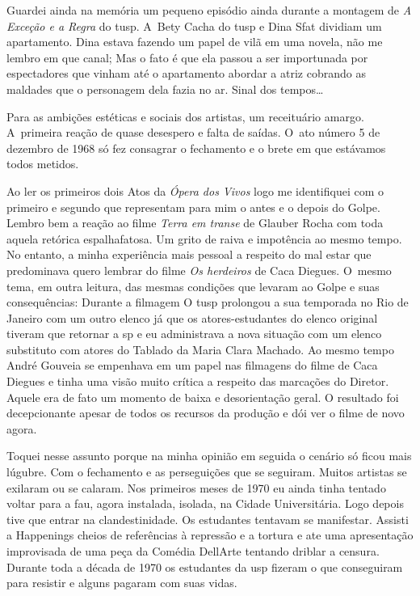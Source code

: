 Guardei ainda na memória um pequeno episódio ainda durante a montagem de
{\it A Exceção e a Regra} do {\sc tusp}. A~Bety Cacha do {\sc tusp} e Dina Sfat
dividiam um apartamento. Dina estava fazendo um papel de vilã em uma
novela, não me lembro em que canal; Mas o fato é que ela passou a ser
importunada por espectadores que vinham até o apartamento abordar a
atriz cobrando as maldades que o personagem dela fazia no ar. Sinal dos
tempos\ldots{}

Para as ambições estéticas e sociais dos artistas, um receituário
amargo. A~primeira reação de quase desespero e falta de saídas. O~ato
número 5 de dezembro de 1968 só fez consagrar o fechamento e o brete em
que estávamos todos metidos.

Ao ler os primeiros dois Atos da {\it Ópera dos Vivos} logo me
identifiquei com o primeiro e segundo que representam para mim o antes e
o depois do Golpe. Lembro bem a reação ao filme {\it Terra em transe} de
Glauber Rocha com toda aquela retórica espalhafatosa. Um grito de raiva
e impotência ao mesmo tempo. No entanto, a minha experiência mais
pessoal a respeito do mal estar que predominava quero lembrar do filme
{\it Os herdeiros} de Caca Diegues. O~mesmo tema, em outra leitura, das
mesmas condições que levaram ao Golpe e suas consequências: Durante a
filmagem O {\sc tusp} prolongou a sua temporada no Rio de Janeiro com um outro
elenco já que os atores-estudantes do elenco original tiveram que
retornar a {\sc sp} e eu administrava a nova situação com um elenco substituto
com atores do Tablado da Maria Clara Machado. Ao mesmo tempo André
Gouveia se empenhava em um papel nas filmagens do filme de Caca Diegues
e tinha uma visão muito crítica a respeito das marcações do Diretor.
Aquele era de fato um momento de baixa e desorientação geral. O
resultado foi decepcionante apesar de todos os recursos da produção e
dói ver o filme de novo agora.

Toquei nesse assunto porque na minha opinião em seguida o cenário só
ficou mais lúgubre. Com o fechamento e as perseguições que se seguiram.
Muitos artistas se exilaram ou se calaram. Nos primeiros meses de 1970
eu ainda tinha tentado voltar para a {\sc fau}, agora instalada, isolada, na
Cidade Universitária. Logo depois tive que entrar na clandestinidade. Os
estudantes tentavam se manifestar. Assisti a Happenings cheios de
referências à repressão e a tortura e ate uma apresentação improvisada
de uma peça da Comédia DellArte tentando driblar a censura. Durante toda
a década de 1970 os estudantes da {\sc usp} fizeram o que conseguiram para
resistir e alguns pagaram com suas vidas.

